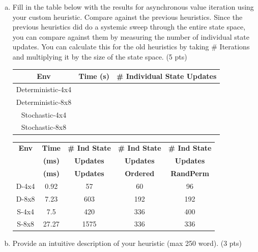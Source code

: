 \documentclass[12pt]{article}
\begin{document}
\begin{enumerate}[a)]
\item Fill in the table below with the results for asynchronous value iteration using your custom heuristic. Compare against the previous heuristics. Since the previous heuristics did do a systemic sweep through the entire state space, you can compare against them by measuring the number of individual state updates. You can calculate this for the old heuristics by taking \# Iterations and multiplying it by the size of the state space. (5 pts)
\begin{center}
  \begin{tabular}{|c|c|c|}\hline
    {\bf Env} & {\bf Time (s)} & {\bf \# Individual State Updates} \\ \hline
    Deterministic-4x4 & & \\ \hline
    Deterministic-8x8 & & \\ \hline
    Stochastic-4x4    & & \\ \hline
    Stochastic-8x8    & & \\ \hline
  \end{tabular}
\end{center}

\begin{solution}
\begin{center}
  \begin{tabular}{|c|c|c|c|c|}\hline
    {\bf Env} & {\bf Time} & {\bf \# Ind State} & {\bf \# Ind State} & {\bf \# Ind State} \\
    {\bf} & {\bf (ms)} & {\bf Updates} & {\bf Updates} & {\bf Updates} \\ 
    {\bf} & {\bf (ms)} & {\bf Updates} & {\bf Ordered} & {\bf RandPerm} \\ \hline
    D-4x4 & 0.92 & 57 & 60 & 96 \\ \hline
    D-8x8 & 7.23 & 603 & 192 & 192 \\ \hline
    S-4x4 & 7.5 & 420 & 336 & 400 \\ \hline
    S-8x8 & 27.27 & 1575 & 336 & 336 \\ \hline
  \end{tabular}
\end{center}
\end{solution}

\item Provide an intuitive description of your heuristic (max 250 word). (3 pts)


\end{enumerate}
\end{document}
